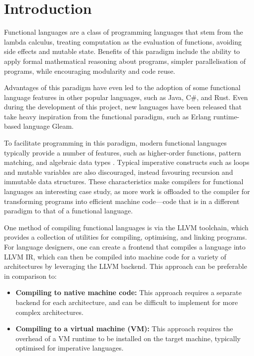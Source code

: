\chapter{Introduction}

Functional languages are a class of programming languages that stem from the lambda calculus,
treating computation as the evaluation of functions, avoiding side effects and mutable state.
Benefits of this paradigm include the ability to apply formal mathematical reasoning about programs,
simpler parallelisation of programs, while encouraging modularity and code reuse.

Advantages of this paradigm have even led to the adoption of some functional language features in
other popular languages, such as Java, C\#, and Rust. Even during the development of this project,
new languages have been released that take heavy inspiration from the functional paradigm, such as
Erlang runtime-based language Gleam.

To facilitate programming in this paradigm, modern functional languages typically provide a number
of features, such as higher-order functions, pattern matching, and algebraic data types
\autocite{hudak1989conception}. Typical imperative constructs such as loops and mutable variables
are also discouraged, instead favouring recursion and immutable data structures. These
characteristics make compilers for functional languages an interesting case study, as more work is
offloaded to the compiler for transforming programs into efficient machine code---code that is in a
different paradigm to that of a functional language.

One method of compiling functional languages is via the LLVM toolchain, which provides a collection
of utilities for compiling, optimising, and linking programs. For language designers, one can create
a frontend that compiles a language into LLVM IR, which can then be compiled into machine code for a
variety of architectures by leveraging the LLVM backend. This approach can be preferable in
comparison to:

\begin{itemize}
    \item \textbf{Compiling to native machine code:} This approach requires a separate backend for
          each architecture, and can be difficult to implement for more complex architectures.
    \item \textbf{Compiling to a virtual machine (VM):} This approach requires the overhead of a VM
          runtime to be installed on the target machine, typically optimised for imperative
          languages.
\end{itemize}


